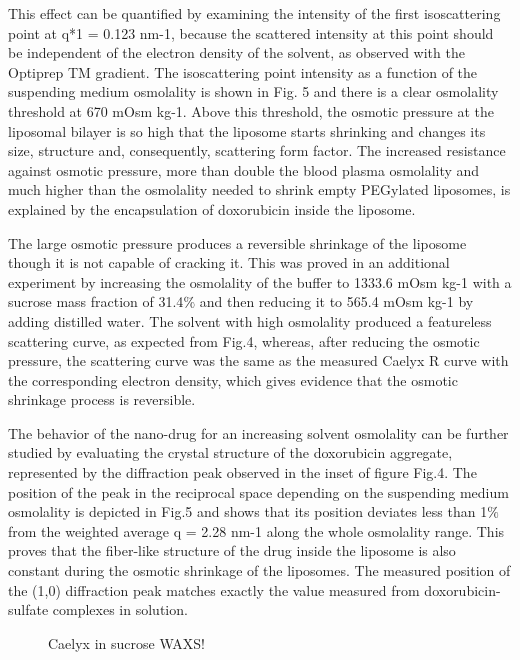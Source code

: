 This effect can be quantified by examining the intensity of the first isoscattering point at q*1 = 0.123 nm-1, because the scattered intensity at this point should be independent of the electron density of the solvent, as observed with the Optiprep TM gradient. The isoscattering point intensity as a function of the suspending medium osmolality is shown in Fig. 5 and there is a clear osmolality threshold at 670 mOsm kg-1. Above this threshold, the osmotic pressure at the liposomal bilayer is so high that the liposome starts shrinking and changes its size, structure and, consequently, scattering form factor. The increased resistance against osmotic pressure, more than double the blood plasma osmolality and much higher than the osmolality needed to shrink empty PEGylated liposomes, is explained by the encapsulation of doxorubicin inside the liposome.

The large osmotic pressure produces a reversible shrinkage of the liposome though it is not capable of cracking it. This was proved in an additional experiment by increasing the osmolality of the buffer to 1333.6 mOsm kg-1 with a sucrose mass fraction of 31.4$\%$ and then reducing it to 565.4 mOsm kg-1 by adding distilled water. The solvent with high osmolality produced a featureless scattering curve, as expected from Fig.4, whereas, after reducing the osmotic pressure, the scattering curve was the same as the measured Caelyx R curve with the corresponding electron density, which gives evidence that the osmotic shrinkage process is reversible.

The behavior of the nano-drug for an increasing solvent osmolality can be further studied by evaluating the crystal structure of the doxorubicin aggregate, represented by the diffraction peak observed in the inset of figure Fig.4. The position of the peak in the reciprocal space depending on the suspending medium osmolality is depicted in Fig.5 and shows that its position deviates less than 1$\%$ from the weighted average q = 2.28 nm-1 along the whole osmolality range. This proves that the fiber-like structure of the drug inside the liposome is also constant during the osmotic shrinkage of the liposomes. The measured position of the (1,0) diffraction peak matches exactly the value measured from doxorubicin-sulfate complexes in solution.

\begin{figure}
	\centering
		\caption{Caelyx in sucrose WAXS!}
\end{figure}

